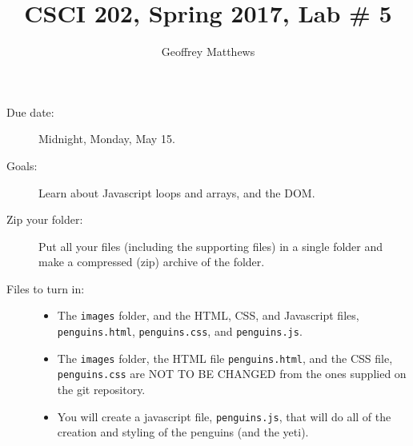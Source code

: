 \documentclass{article}
\title{CSCI 202, Spring 2017, Lab \# 5}
\author{Geoffrey Matthews}
\begin{document}
\maketitle

\begin{description}

\item[Due date:] Midnight, Monday, May 15.

\item[Goals:] Learn about Javascript loops and arrays, and the DOM.

  

\item[Zip your folder:]
  Put all your files (including the supporting files) in a single
  folder and  make a compressed (zip) archive of the folder.

\item[Files to turn in:]\mbox{}
  \begin{itemize}
\item The {\tt images} folder, and the HTML, CSS, and Javascript
  files, {\tt penguins.html}, {\tt penguins.css}, and {\tt penguins.js}.
  \item
    The {\tt images} folder, the HTML file {\tt penguins.html}, and
    the CSS file, {\tt penguins.css} are NOT TO BE CHANGED from the
    ones supplied on the git repository.
  \item
    You will create a javascript file, {\tt penguins.js}, that will do
    all of the creation and styling of the penguins (and the yeti).
  \end{itemize}


\end{description}
\end{document}

